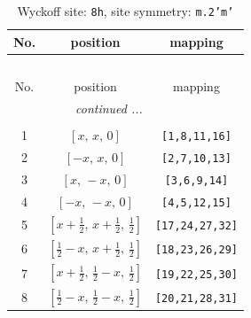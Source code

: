 \documentclass[fleqn,8pt]{jsarticle}
\begin{document}
\begin{longtable}{ccc}
\caption{Wyckoff site: {\tt 8h}, site symmetry: {\tt m.2'm'}}
 \\
 \hline \hline
No. & position & mapping \\ \hline \endfirsthead

\multicolumn{2}{l}{\tablename\ \thetable{}} \\
 \hline \hline
No. & position & mapping \\ \hline \endhead

 \hline \hline
\multicolumn{2}{r}{\footnotesize\it continued ...} \\ \endfoot

 \hline \hline
\multicolumn{2}{r}{} \\ \endlastfoot

1 & $\left[ x,\, x,\, 0 \right]$ & {\tt [1,8,11,16]} \\ \hline
2 & $\left[ - x,\, x,\, 0 \right]$ & {\tt [2,7,10,13]} \\ \hline
3 & $\left[ x,\, - x,\, 0 \right]$ & {\tt [3,6,9,14]} \\ \hline
4 & $\left[ - x,\, - x,\, 0 \right]$ & {\tt [4,5,12,15]} \\ \hline
5 & $\left[ x + \frac{1}{2},\, x + \frac{1}{2},\, \frac{1}{2} \right]$ & {\tt [17,24,27,32]} \\ \hline
6 & $\left[ \frac{1}{2} - x,\, x + \frac{1}{2},\, \frac{1}{2} \right]$ & {\tt [18,23,26,29]} \\ \hline
7 & $\left[ x + \frac{1}{2},\, \frac{1}{2} - x,\, \frac{1}{2} \right]$ & {\tt [19,22,25,30]} \\ \hline
8 & $\left[ \frac{1}{2} - x,\, \frac{1}{2} - x,\, \frac{1}{2} \right]$ & {\tt [20,21,28,31]} \\
\end{longtable}
\renewcommand{\arraystretch}{1.2}
\end{document}
